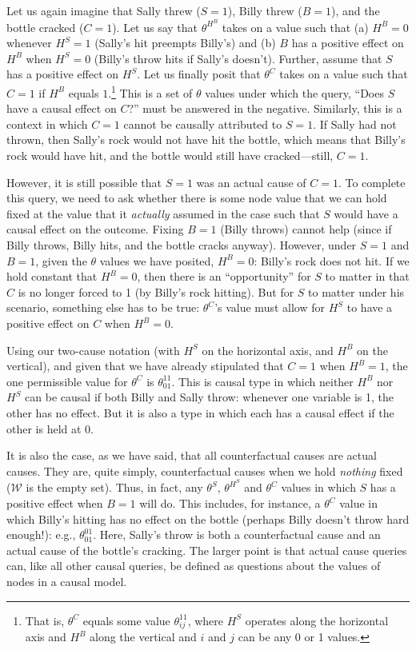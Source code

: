 \documentclass[12pt,]{book}
\let\rmarkdownfootnote\footnote%
\def\footnote{\protect\rmarkdownfootnote}
\begin{document}
Let us again imagine that Sally threw (\(S=1\)), Billy threw (\(B=1\)), and the bottle cracked (\(C=1\)). Let us say that \(\theta^{H^B}\) takes on a value such that (a) \(H^B=0\) whenever \(H^S=1\) (Sally's hit preempts Billy's) and (b) \(B\) has a positive effect on \(H^B\) when \(H^S=0\) (Billy's throw hits if Sally's doesn't). Further, assume that \(S\) has a positive effect on \(H^S\). Let us finally posit that \(\theta^C\) takes on a value such that \(C=1\) if \(H^B\) equals \(1\).\footnote{That is, \(\theta^C\) equals some value \(\theta_{ij}^{11}\), where \(H^S\) operates along the horizontal axis and \(H^B\) along the vertical and \(i\) and \(j\) can be any 0 or 1 values.} This is a set of \(\theta\) values under which the query, ``Does \(S\) have a causal effect on \(C\)?'' must be answered in the negative. Similarly, this is a context in which \(C=1\) cannot be causally attributed to \(S=1\). If Sally had not thrown, then Sally's rock would not have hit the bottle, which means that Billy's rock would have hit, and the bottle would still have cracked---still, \(C=1\).

However, it is still possible that \(S=1\) was an actual cause of \(C=1\). To complete this query, we need to ask whether there is some node value that we can hold fixed at the value that it \emph{actually} assumed in the case such that \(S\) would have a causal effect on the outcome. Fixing \(B=1\) (Billy throws) cannot help (since if Billy throws, Billy hits, and the bottle cracks anyway). However, under \(S=1\) and \(B=1\), given the \(\theta\) values we have posited, \(H^B=0\): Billy's rock does not hit. If we hold constant that \(H^B=0\), then there is an ``opportunity'' for \(S\) to matter in that \(C\) is no longer forced to 1 (by Billy's rock hitting). But for \(S\) to matter under his scenario, something else has to be true: \(\theta^C\)'s value must allow for \(H^S\) to have a positive effect on \(C\) when \(H^B=0\).

Using our two-cause notation (with \(H^S\) on the horizontal axis, and \(H^B\) on the vertical), and given that we have already stipulated that \(C=1\) when \(H^B=1\), the one permissible value for \(\theta^C\) is \(\theta^{11}_{01}\). This is causal type in which neither \(H^B\) nor \(H^S\) can be causal if both Billy and Sally throw: whenever one variable is 1, the other has no effect. But it is also a type in which each has a causal effect if the other is held at 0.

It is also the case, as we have said, that all counterfactual causes are actual causes. They are, quite simply, counterfactual causes when we hold \emph{nothing} fixed (\(\mathcal W\) is the empty set). Thus, in fact, any \(\theta^S\), \(\theta^{H^S}\) and \(\theta^C\) values in which \(S\) has a positive effect when \(B=1\) will do. This includes, for instance, a \(\theta^C\) value in which Billy's hitting has no effect on the bottle (perhaps Billy doesn't throw hard enough!): e.g., \(\theta^{01}_{01}\). Here, Sally's throw is both a counterfactual cause and an actual cause of the bottle's cracking. The larger point is that actual cause queries can, like all other causal queries, be defined as questions about the values of nodes in a causal model.
\end{document}
